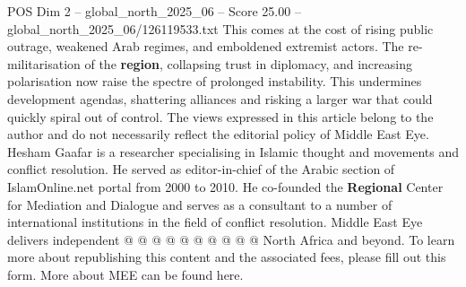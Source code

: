 \begin{textsample}{POS Dim 2 – global\_north\_2025\_06 – Score 25.00 – global\_north\_2025\_06/126119533.txt}
This comes at the cost of rising public outrage, weakened Arab regimes, and emboldened extremist actors.
The re-militarisation of the \textbf{region}, collapsing trust in diplomacy, and increasing polarisation now raise the spectre of prolonged instability.
This undermines development agendas, shattering alliances and risking a larger war that could quickly spiral out of control.
The views expressed in this article belong to the author and do not necessarily reflect the editorial policy of Middle East Eye.
Hesham Gaafar is a researcher specialising in Islamic thought and movements and conflict resolution.
He served as editor-in-chief of the Arabic section of IslamOnline.net portal from 2000 to 2010.
He co-founded the \textbf{Regional} Center for Mediation and Dialogue and serves as a consultant to a number of international institutions in the field of conflict resolution.
Middle East Eye delivers independent @ @ @ @ @ @ @ @ @ @ North Africa and beyond.
To learn more about republishing this content and the associated fees, please fill out this form.
More about MEE can be found here.

\end{textsample}
